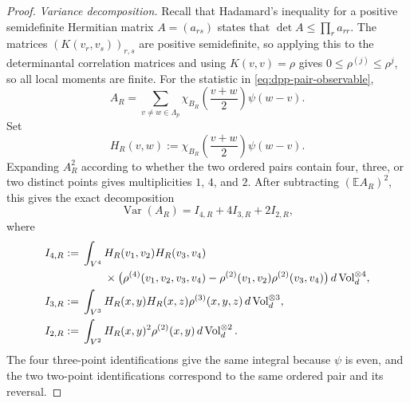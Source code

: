 \documentclass[11pt,reqno,a4paper]{amsart}
\numberwithin{equation}{section}
\theoremstyle{compact}
\theoremstyle{definition}
\theoremstyle{definition}
\newcommand{\Var}{\operatorname{Var}}
\newcommand{\Vol}{\operatorname{Vol}}
\begin{document}
\begin{proof}
\smallskip\noindent\emph{Variance decomposition.}
Recall that Hadamard's inequality for a positive semidefinite
Hermitian matrix $A=(a_{rs})$ states that
$\det A\leq\prod_r a_{rr}$.  The matrices $(K(v_r,v_s))_{r,s}$ are positive semidefinite, so applying this
to the determinantal correlation matrices and using $K(v,v)=\rho$ gives
$0\leq\rho^{(j)}\leq\rho^j$, so all local moments are finite.  For the
statistic in \eqref{eq:dpp-pair-observable},
\begin{equation}\label{eq:dpp-pair-observable-sum}
  A_R
  =\sum_{v\neq w\in\Lambda_p}
       \chi_{B_R}\!\left(\frac{v+w}{2}\right)\psi(w-v).
\end{equation}
Set
\[
  H_R(v,w):=\chi_{B_R}\!\left(\frac{v+w}{2}\right)\psi(w-v).
\]
Expanding $A_R^2$ according to whether the two ordered pairs contain four,
three, or two distinct points gives multiplicities $1$, $4$, and $2$.
After subtracting $(\mathbb EA_R)^2$, this gives the exact decomposition
\begin{equation}\label{eq:dpp-pair-variance-decomposition}
  \Var(A_R)=I_{4,R}+4I_{3,R}+2I_{2,R},
\end{equation}
where
\begin{align}
I_{4,R}
  :={}&\int_{V^4}H_R(v_1,v_2)H_R(v_3,v_4)\notag\\
     &\qquad\times
       \big(\rho^{(4)}(v_1,v_2,v_3,v_4)
       -\rho^{(2)}(v_1,v_2)\rho^{(2)}(v_3,v_4)\big)
       \,d\Vol_d^{\otimes4},\label{eq:dpp-I4R}\\
I_{3,R}
  :={}&\int_{V^3}H_R(x,y)H_R(x,z)
       \rho^{(3)}(x,y,z)\,d\Vol_d^{\otimes3},\label{eq:dpp-I3R}\\
I_{2,R}
  :={}&\int_{V^2}H_R(x,y)^2
       \rho^{(2)}(x,y)\,d\Vol_d^{\otimes2}.\label{eq:dpp-I2R}
\end{align}
The four three-point identifications give the same integral because $\psi$ is
even, and the two two-point identifications correspond to the same ordered
pair and its reversal.


\end{proof}
\end{document}
